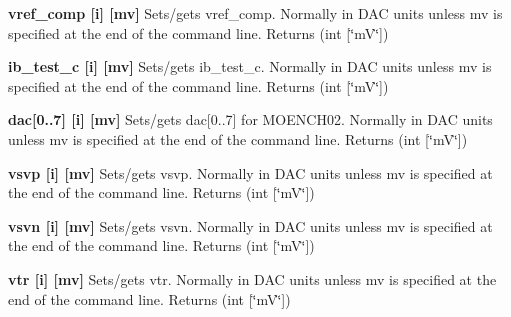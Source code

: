 \begin{DoxyItemize}
\item {\bfseries vref\_\-comp \mbox{[}i\mbox{]} \mbox{[}mv\mbox{]}} Sets/gets vref\_\-comp. Normally in DAC units unless {\ttfamily mv} is specified at the end of the command line. {\ttfamily Returns} {\ttfamily }(int \mbox{[}\char`\"{}mV\char`\"{}\mbox{]})
\end{DoxyItemize}


\begin{DoxyItemize}
\item {\bfseries ib\_\-test\_\-c \mbox{[}i\mbox{]} \mbox{[}mv\mbox{]}} Sets/gets ib\_\-test\_\-c. Normally in DAC units unless {\ttfamily mv} is specified at the end of the command line. {\ttfamily Returns} {\ttfamily }(int \mbox{[}\char`\"{}mV\char`\"{}\mbox{]})
\end{DoxyItemize}


\begin{DoxyItemize}
\item {\bfseries dac\mbox{[}0..7\mbox{]} \mbox{[}i\mbox{]} \mbox{[}mv\mbox{]}} Sets/gets dac\mbox{[}0..7\mbox{]} for MOENCH02. Normally in DAC units unless {\ttfamily mv} is specified at the end of the command line. {\ttfamily Returns} {\ttfamily }(int \mbox{[}\char`\"{}mV\char`\"{}\mbox{]})
\end{DoxyItemize}


\begin{DoxyItemize}
\item {\bfseries vsvp \mbox{[}i\mbox{]} \mbox{[}mv\mbox{]}} Sets/gets vsvp. Normally in DAC units unless {\ttfamily mv} is specified at the end of the command line. {\ttfamily Returns} {\ttfamily }(int \mbox{[}\char`\"{}mV\char`\"{}\mbox{]})
\end{DoxyItemize}


\begin{DoxyItemize}
\item {\bfseries vsvn \mbox{[}i\mbox{]} \mbox{[}mv\mbox{]}} Sets/gets vsvn. Normally in DAC units unless {\ttfamily mv} is specified at the end of the command line. {\ttfamily Returns} {\ttfamily }(int \mbox{[}\char`\"{}mV\char`\"{}\mbox{]})
\end{DoxyItemize}


\begin{DoxyItemize}
\item {\bfseries vtr \mbox{[}i\mbox{]} \mbox{[}mv\mbox{]}} Sets/gets vtr. Normally in DAC units unless {\ttfamily mv} is specified at the end of the command line. {\ttfamily Returns} {\ttfamily }(int \mbox{[}\char`\"{}mV\char`\"{}\mbox{]})
\end{DoxyItemize}


